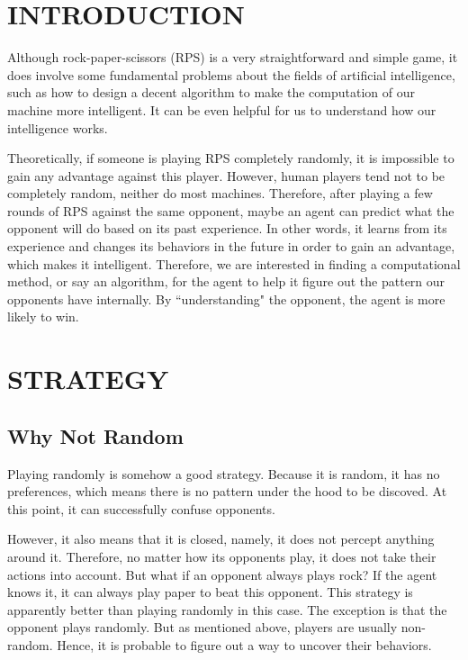 \documentclass[10pt]{article}
\begin{document}
\maketitle

\section{INTRODUCTION}
Although rock-paper-scissors (RPS) is a very straightforward and simple game, it does involve some fundamental problems about the fields of artificial intelligence, such as how to design a decent algorithm to make the computation of our machine more intelligent. It can be even helpful for us to understand how our intelligence works.

Theoretically, if someone is playing RPS completely randomly, it is impossible to gain any advantage against this player. However, human players tend not to be completely random, neither do most machines. Therefore, after playing a few rounds of RPS against the same opponent, maybe an agent can predict what the opponent will do based on its past experience. In other words, it learns from its experience and changes its behaviors in the future in order to gain an advantage, which makes it intelligent. Therefore, we are interested in finding a computational method, or say an algorithm, for the agent to help it figure out the pattern our opponents have internally. By ``understanding" the opponent, the agent is more likely to win.

\section{STRATEGY}
\subsection{Why Not Random}
Playing randomly is somehow a good strategy. Because it is random, it has no preferences, which means there is no pattern under the hood to be discoved. At this point, it can successfully confuse opponents. 

However, it also means that it is closed, namely, it does not percept anything around it. Therefore, no matter how its opponents play, it does not take their actions into account. But what if an opponent always plays rock? If the agent knows it, it can always play paper to beat this opponent. This strategy is apparently better than playing randomly in this case. The exception is that the opponent plays randomly. But as mentioned above, players are usually non-random. Hence, it is probable to figure out a way to uncover their behaviors.
\end{document}
